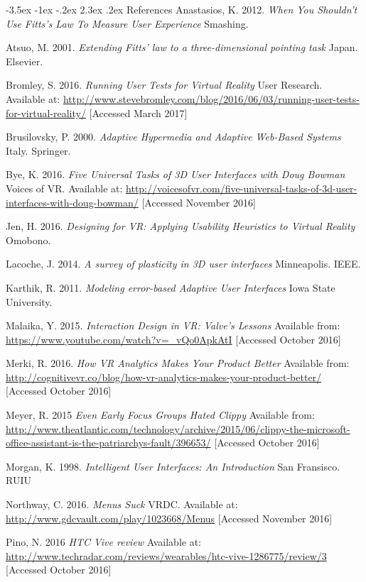 \documentclass[12pt]{article}
\makeatletter
\renewcommand{\section}{\@startsection {section}{1}{\z@}%
             {-3.5ex \@plus -1ex \@minus -.2ex}%
             {2.3ex \@plus .2ex}%
             {\normalfont\Large\scshape\bfseries}}
\makeatother
\begin{document}
\section{References}
Anastasios, K. 2012. \emph{When You Shouldn't Use Fitts's Law To Measure User Experience} Smashing. 

Atsuo, M. 2001. \emph{Extending Fitts' law to a three-dimensional pointing task} Japan. Elsevier. 

Bromley, S. 2016. \emph{Running User Tests for Virtual Reality} User Research. Available at: \url{http://www.stevebromley.com/blog/2016/06/03/running-user-tests-for-virtual-reality/} [Accessed March 2017]

Brusilovsky, P. 2000. \emph{Adaptive Hypermedia and Adaptive Web-Based Systems} Italy. Springer.

Bye, K. 2016. \emph{Five Universal Tasks of 3D User Interfaces with Doug Bowman} Voices of VR. Available at: \url{http://voicesofvr.com/five-universal-tasks-of-3d-user-interfaces-with-doug-bowman/} [Accessed November 2016]

Jen, H. 2016. \emph{Designing for VR: Applying Usability Heuristics to Virtual Reality} Omobono. 

Lacoche, J. 2014. \emph{A survey of plasticity in 3D user interfaces} Minneapolis. IEEE. 

Karthik, R. 2011. \emph{Modeling error-based Adaptive User Interfaces} Iowa State University. 

Malaika, Y. 2015. \emph{Interaction Design in VR: Valve's Lessons } Available from: \url{https://www.youtube.com/watch?v=_vQo0ApkAtI} [Accessed October 2016]

Merki, R. 2016. \emph{How VR Analytics Makes Your Product Better} Available from: \url{http://cognitivevr.co/blog/how-vr-analytics-makes-your-product-better/} [Accessed October 2016]

Meyer, R. 2015 \emph{Even Early Focus Groups Hated Clippy} Available from: \url{http://www.theatlantic.com/technology/archive/2015/06/clippy-the-microsoft-office-assistant-is-the-patriarchys-fault/396653/} [Accessed October 2016]

Morgan, K. 1998. \emph{Intelligent User Interfaces: An Introduction} San Fransisco. RUIU 

Northway, C. 2016. \emph{Menus Suck} VRDC. Available at: \url{http://www.gdcvault.com/play/1023668/Menus} [Accessed November 2016]

Pino, N. 2016 \emph{HTC Vive review} Available at: \url{http://www.techradar.com/reviews/wearables/htc-vive-1286775/review/3} [Accessed October 2016]
\end{document}
